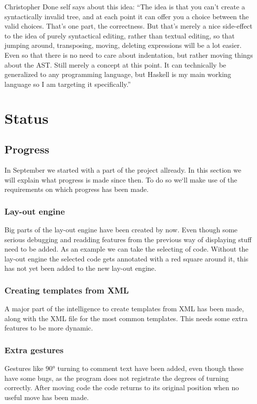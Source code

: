 \documentclass[a4paper,12pt]{report}
\begin{document}
Christopher Done self says about this idea: ``The idea is that you can't create a syntactically invalid tree, and at each point it can offer you a choice between the valid choices. That's one part, 
the correctness. But that's merely a nice side-effect to the idea of purely syntactical editing, rather than textual editing, so that jumping around, transposing, moving, deleting expressions will 
be a lot easier. Even so that there is no need to care about indentation, but rather moving things about the AST. Still merely a concept at this point. It can technically be generalized to any programming 
language, but Haskell is my main working language so I am targeting it specifically.''
\chapter{Status}
\section{Progress}
In September we started with a part of the project allready. In this section we will explain what progress is made since then. To do so we`ll make use of the requirements on which progress has been made.
\subsection{Lay-out engine}
Big parts of the lay-out engine have been created by now. Even though some serious debugging and readding features from the previous way of displaying stuff need to be added. As an example we can take
the selecting of code. Without the lay-out engine the selected code gets annotated with a red square around it, this has not yet been added to the new lay-out engine.
\subsection{Creating templates from XML}
A major part of the intelligence to create templates from XML has been made, along with the XML file for the most common templates. This needs some extra features to be more dynamic.
\subsection{Extra gestures}
Gestures like 90° turning to comment text have been added, even though these have some bugs, as the program does not registrate the degrees of turning correctly.
After moving code the code returns to its original position when no useful move has been made.
\end{document}
